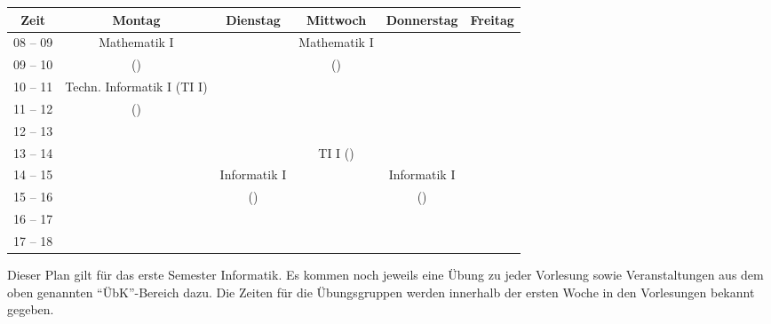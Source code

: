 \begin{minipage}{\textwidth}
    \footnotesize
\begin{center}
	\begin{tabular}{|c|c|c|c|c|c|}
	\hline
	 Zeit     &    Montag                    & Dienstag          & Mittwoch          	& Donnerstag 			& Freitag		\\ \hline\hline
	 08 -- 09 &    Mathematik I              &                   & Mathematik I      	&  				&			\\ \cline{1-1} \cline{3-3} \cline{5-6} 
	 09 -- 10 &    (\Matheprof)              &                   & (\Matheprof) 		&  				&			\\ \hline
	 10 -- 11 &    Techn. Informatik I (TI I)&                   &                   	&  				&			\\ \cline{1-1} \cline{3-6}
	 11 -- 12 &    (\TechInfoprof)		 &                   &                   	&  				&			\\ \hline
	 12 -- 13 &                              &                   &  			&  				&			\\ \cline{1-3} \cline{3-6}
	 13 -- 14 &                              &                   & TI I (\TechInfoprof)& 				&			\\ \hline
	 14 -- 15 &                              & Informatik I      &                 		&  Informatik I 		&			\\ \cline{1-2} \cline{4-4} \cline{6-6}
	 15 -- 16 &                              & (\Infoprof)       &	                   	&  (\Infoprof) 			&			\\ \hline
	 16 -- 17 &                              &                   &                   	&  				&			\\ \hline
	 17 -- 18 &                              &                   &                   	&  				&			\\ \hline
	\end{tabular}

\end{center}
\end{minipage}

Dieser Plan gilt für das erste Semester Informatik. Es kommen noch jeweils eine Übung zu jeder Vorlesung
sowie Veranstaltungen aus dem oben genannten "`ÜbK"'-Bereich dazu.
Die Zeiten für die Übungsgruppen werden innerhalb der ersten Woche in den Vorlesungen bekannt gegeben. \\ \\ \noindent
